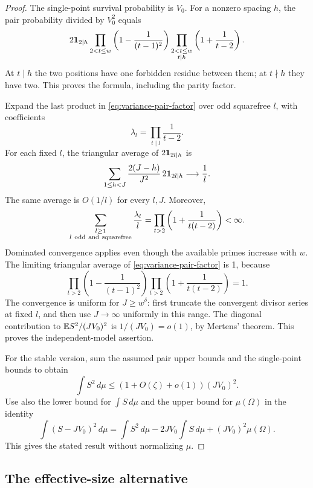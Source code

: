 \begin{proof}
The single-point survival probability is \(V_0\).
For a nonzero spacing \(h\), the pair probability divided by \(V_0^2\)
equals
\begin{equation}\label{eq:variance-pair-factor}
 2\mathbf 1_{2\mid h}
 \prod_{2<t\le w}\left(1-\frac1{(t-1)^2}\right)
 \prod_{\substack{2<t\le w\\t\mid h}}
       \left(1+\frac1{t-2}\right).
\end{equation}
At \(t\mid h\) the two positions have one forbidden residue between
them; at \(t\nmid h\) they have two. This proves the formula, including
the parity factor.

Expand the last product in \eqref{eq:variance-pair-factor} over odd
squarefree \(l\), with coefficients
\[
 \lambda_l=\prod_{t\mid l}\frac1{t-2}.
\]
For each fixed \(l\), the triangular average of \(2\mathbf 1_{2l\mid h}\) is
\[
 \sum_{1\le h<J}\frac{2(J-h)}{J^2}\,2\mathbf 1_{2l\mid h}
 \longrightarrow\frac1l.
\]
The same average is \(O(1/l)\) for every \(l,J\). Moreover,
\[
 \sum_{\substack{l\ge1\\l\ {\rm odd\ and\ squarefree}}}\frac{\lambda_l}{l}
 =\prod_{t>2}\left(1+\frac1{t(t-2)}\right)<\infty.
\]
Dominated convergence applies even though the available primes increase
with \(w\). The limiting triangular average of
\eqref{eq:variance-pair-factor} is 1, because
\[
 \prod_{t>2}\left(1-\frac1{(t-1)^2}\right)
 \prod_{t>2}\left(1+\frac1{t(t-2)}\right)=1.
\]
The convergence is uniform for \(J\ge w^\delta\): first truncate the
convergent divisor series at fixed \(l\), and then use \(J\to\infty\)
uniformly in this range. The diagonal contribution to
\(\mathbb E S^2/(JV_0)^2\) is \(1/(JV_0)=o(1)\), by Mertens' theorem.
This proves the independent-model assertion.

For the stable version, sum the assumed pair upper bounds and the
single-point bounds to obtain
\[
 \int S^2\,d\mu\le
 (1+O(\zeta)+o(1))(JV_0)^2.
\]
Use also the lower bound for \(\int S\,d\mu\) and the upper bound for
\(\mu(\Omega)\) in the identity
\[
 \int(S-JV_0)^2\,d\mu
 =\int S^2\,d\mu-2JV_0\int S\,d\mu+(JV_0)^2\mu(\Omega).
\]
This gives the stated result without normalizing \(\mu\).
\end{proof}

\subsection{The effective-size alternative}


